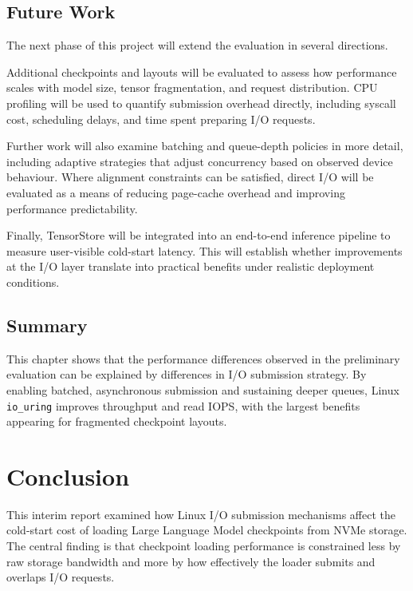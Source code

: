 \documentclass[]{final_report}
\begin{document}
\section{Future Work}

The next phase of this project will extend the evaluation in several directions.

Additional checkpoints and layouts will be evaluated to assess how performance scales with model size, tensor fragmentation, and request distribution. CPU profiling will be used to quantify submission overhead directly, including syscall cost, scheduling delays, and time spent preparing I/O requests.

Further work will also examine batching and queue-depth policies in more detail, including adaptive strategies that adjust concurrency based on observed device behaviour. Where alignment constraints can be satisfied, direct I/O will be evaluated as a means of reducing page-cache overhead and improving performance predictability.

Finally, TensorStore will be integrated into an end-to-end inference pipeline to measure user-visible cold-start latency. This will establish whether improvements at the I/O layer translate into practical benefits under realistic deployment conditions.

\section{Summary}

This chapter shows that the performance differences observed in the preliminary evaluation can be explained by differences in I/O submission strategy. By enabling batched, asynchronous submission and sustaining deeper queues, Linux \texttt{io\_uring} improves throughput and read IOPS, with the largest benefits appearing for fragmented checkpoint layouts.


\newpage


\chapter{Conclusion}
\label{chap:conclusion}

This interim report examined how Linux I/O submission mechanisms affect the cold-start cost of loading Large Language Model checkpoints from NVMe storage. The central finding is that checkpoint loading performance is constrained less by raw storage bandwidth and more by how effectively the loader submits and overlaps I/O requests.
\end{document}
